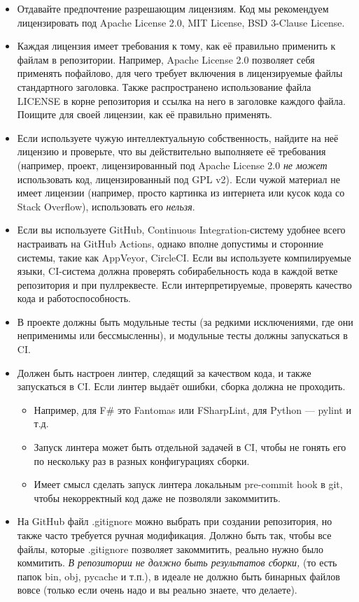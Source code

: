 \documentclass[a5paper]{article}
\begin{document}
\begin{itemize}
    \item Отдавайте предпочтение разрешающим лицензиям. Код мы рекомендуем лицензировать под Apache License 2.0, MIT License, BSD 3-Clause License.
    \item Каждая лицензия имеет требования к тому, как её правильно применить к файлам в репозитории. Например, Apache License 2.0 позволяет себя применять пофайлово, для чего требует включения в лицензируемые файлы стандартного заголовка. Также распространено использование файла LICENSE в корне репозитория и ссылка на него в заголовке каждого файла. Поищите для своей лицензии, как её правильно применять.
    \item Если используете чужую интеллектуальную собственность, найдите на неё лицензию и проверьте, что вы действительно выполняете её требования (например, проект, лицензированный под Apache License 2.0 \emph{не может} использовать код, лицензированный под GPL v2). Если чужой материал не имеет лицензии (например, просто картинка из интернета или кусок кода со Stack Overflow), использовать его \emph{нельзя}.
    \item Если вы используете GitHub, Continuous Integration-систему удобнее всего настраивать на GitHub Actions, однако вполне допустимы и сторонние системы, такие как AppVeyor, CircleCI. Если вы используете компилируемые языки, CI-система должна проверять собирабельность кода в каждой ветке репозитория и при пуллреквесте. Если интерпретируемые, проверять качество кода и работоспособность.
    \item В проекте должны быть модульные тесты (за редкими исключениями, где они неприменимы или бессмысленны), и модульные тесты должны запускаться в CI.
    \item Должен быть настроен линтер, следящий за качеством кода, и также запускаться в CI. Если линтер выдаёт ошибки, сборка должна не проходить.
    \begin{itemize}
        \item Например, для F\# это Fantomas или FSharpLint, для Python --- pylint и т.д.
        \item Запуск линтера может быть отдельной задачей в CI, чтобы не гонять его по нескольку раз в разных конфигурациях сборки.
        \item Имеет смысл сделать запуск линтера локальным pre-commit hook в git, чтобы некорректный код даже не позволяли закоммитить.
    \end{itemize}
    \item На GitHub файл .gitignore можно выбрать при создании репозитория, но также часто требуется ручная модификация. Должно быть так, чтобы все файлы, которые .gitignore позволяет закоммитить, реально нужно было коммитить. \emph{В репозитории не должно быть результатов сборки,} (то есть папок bin, obj, pycache и т.п.), в идеале не должно быть бинарных файлов вовсе (только если очень надо и вы реально знаете, что делаете).

\end{itemize}
\end{document}
